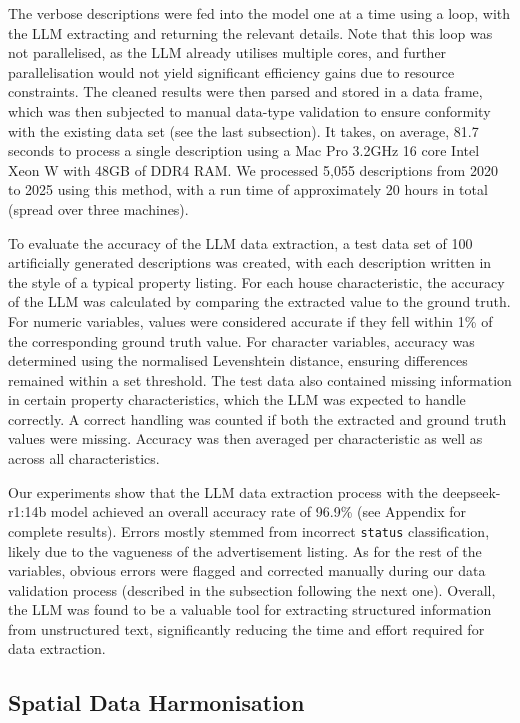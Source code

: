 \documentclass[
  number]{elsarticle}
\begin{document}
The verbose descriptions were fed into the model one at a time using a
loop, with the LLM extracting and returning the relevant details. Note
that this loop was not parallelised, as the LLM already utilises
multiple cores, and further parallelisation would not yield significant
efficiency gains due to resource constraints. The cleaned results were
then parsed and stored in a data frame, which was then subjected to
manual data-type validation to ensure conformity with the existing data
set (see the last subsection). It takes, on average, 81.7 seconds to
process a single description using a Mac Pro 3.2GHz 16 core Intel Xeon W
with 48GB of DDR4 RAM. We processed 5,055 descriptions from 2020 to 2025
using this method, with a run time of approximately 20 hours in total
(spread over three machines).

To evaluate the accuracy of the LLM data extraction, a test data set of
100 artificially generated descriptions was created, with each
description written in the style of a typical property listing. For each
house characteristic, the accuracy of the LLM was calculated by
comparing the extracted value to the ground truth. For numeric
variables, values were considered accurate if they fell within 1\% of
the corresponding ground truth value. For character variables, accuracy
was determined using the normalised Levenshtein distance, ensuring
differences remained within a set threshold. The test data also
contained missing information in certain property characteristics, which
the LLM was expected to handle correctly. A correct handling was counted
if both the extracted and ground truth values were missing. Accuracy was
then averaged per characteristic as well as across all characteristics.

Our experiments show that the LLM data extraction process with the
deepseek-r1:14b model achieved an overall accuracy rate of 96.9\% (see
Appendix for complete results). Errors mostly stemmed from incorrect
\texttt{status} classification, likely due to the vagueness of the
advertisement listing. As for the rest of the variables, obvious errors
were flagged and corrected manually during our data validation process
(described in the subsection following the next one). Overall, the LLM
was found to be a valuable tool for extracting structured information
from unstructured text, significantly reducing the time and effort
required for data extraction.

\subsection{Spatial Data Harmonisation}\label{sec-spatial-harm}
\end{document}
